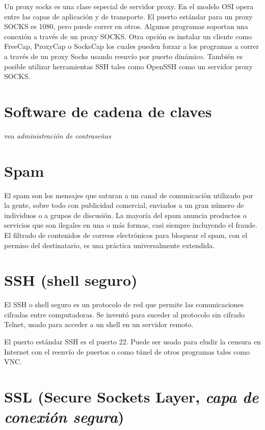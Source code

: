 \documentclass[10pt,a5paper,twoside,,]{book}
\begin{document}
Un proxy socks es una clase especial de servidor proxy. En el modelo OSI
opera entre las capas de aplicación y de transporte. El puerto estándar
para un proxy SOCKS es 1080, pero puede correr en otros. Algunos
programas soportan una conexión a través de un proxy SOCKS. Otra opción
es instalar un cliente como FreeCap, ProxyCap o SocksCap los cuales
pueden forzar a los programas a correr a través de un proxy Socks usando
reenvío por puerto dinámico. También es posible utilizar herramientas
SSH tales como OpenSSH como un servidor proxy SOCKS.

\section{Software de cadena de
claves}\label{software-de-cadena-de-claves}

vea \emph{administración de contraseñas}

\section{Spam}\label{spam}

El spam son los mensajes que saturan a un canal de comunicación
utilizado por la gente, sobre todo con publicidad comercial, enviados a
un gran número de individuos o a grupos de discusión. La mayoría del
spam anuncia productos o servicios que son ilegales en una o más formas,
casi siempre incluyendo el fraude. El filtrado de contenidos de correos
electrónicos para bloquear el spam, con el permiso del destinatario, es
una práctica universalmente extendida.

\section{SSH (shell seguro)}\label{ssh-shell-seguro}

El SSH o shell seguro es un protocolo de red que permite las
comunicaciones cifradas entre computadoras. Se inventó para suceder al
protocolo sin cifrado Telnet, usado para acceder a un shell en un
servidor remoto.

El puerto estándar SSH es el puerto 22. Puede ser usado para eludir la
censura en Internet con el reenvío de puertos o como túnel de otros
programas tales como VNC.

\section{\texorpdfstring{SSL (Secure Sockets Layer, \emph{capa de
conexión
segura})}{SSL (Secure Sockets Layer, capa de conexión segura)}}\label{ssl-secure-sockets-layer-capa-de-conexiuxf3n-segura}
\end{document}
